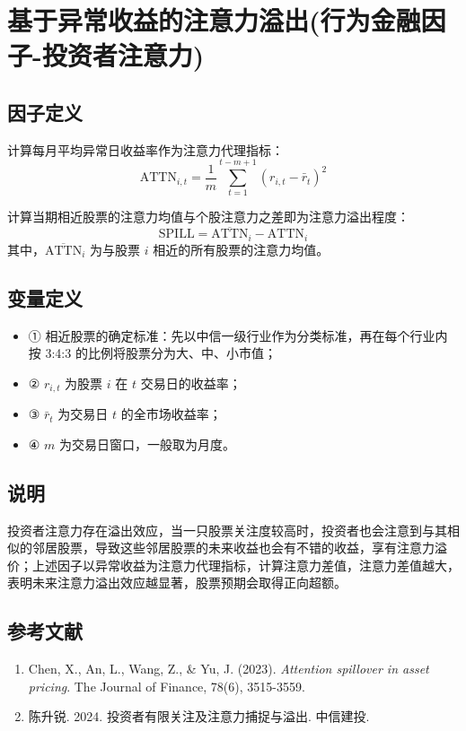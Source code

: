 \documentclass{article}
\begin{document}
\section{基于异常收益的注意力溢出(行为金融因子-投资者注意力)}

\subsection{因子定义}

计算每月平均异常日收益率作为注意力代理指标：
\begin{equation}
    \mathrm{ATTN}_{i,t} = \frac{1}{m} \sum_{t=1}^{t-m+1} (r_{i,t} - \bar{r}_t)^2
\end{equation}

计算当期相近股票的注意力均值与个股注意力之差即为注意力溢出程度：
\begin{equation}
    \mathrm{SPILL} = \overline{\mathrm{ATTN}}_{i} - \mathrm{ATTN}_{i}
\end{equation}
其中，\(\overline{\mathrm{ATTN}}_{i}\) 为与股票 \( i \) 相近的所有股票的注意力均值。

\subsection{变量定义}
\begin{itemize}
    \item ① 相近股票的确定标准：先以中信一级行业作为分类标准，再在每个行业内按 3:4:3 的比例将股票分为大、中、小市值；
    \item ② \( r_{i,t} \) 为股票 \( i \) 在 \( t \) 交易日的收益率；
    \item ③ \( \bar{r}_t \) 为交易日 \( t \) 的全市场收益率；
    \item ④ \( m \) 为交易日窗口，一般取为月度。
\end{itemize}

\subsection{说明}
投资者注意力存在溢出效应，当一只股票关注度较高时，投资者也会注意到与其相似的邻居股票，导致这些邻居股票的未来收益也会有不错的收益，享有注意力溢价；上述因子以异常收益为注意力代理指标，计算注意力差值，注意力差值越大，表明未来注意力溢出效应越显著，股票预期会取得正向超额。

\subsection{参考文献}
\begin{enumerate}
    \item Chen, X., An, L., Wang, Z., \& Yu, J. (2023). \textit{Attention spillover in asset pricing}. The Journal of Finance, 78(6), 3515-3559.
    \item 陈升锐. 2024. 投资者有限关注及注意力捕捉与溢出. 中信建投.
\end{enumerate}
\end{document}

